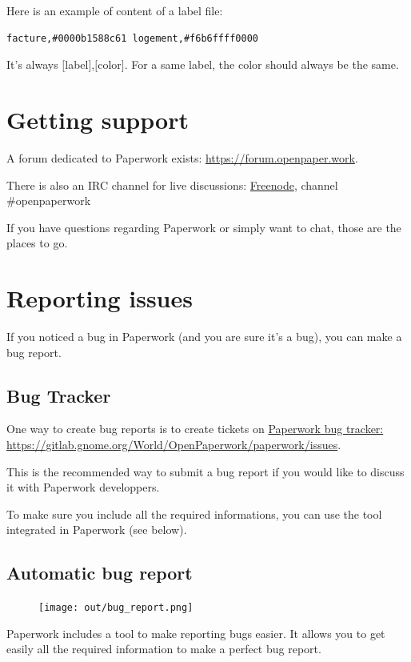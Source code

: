 \documentclass[10pt,a4paper]{article}
\begin{document}
Here is an example of content of a label file:
\begin{verbatim}
facture,#0000b1588c61 logement,#f6b6ffff0000
\end{verbatim}
It's always $[$label$]$,$[$color$]$. For a same label, the color should
always be the same.


\section{Getting support}

A forum dedicated to Paperwork exists:
\href{https://forum.openpaper.work}{https://forum.openpaper.work}.

There is also an IRC channel for live discussions:
\href{https://webchat.freenode.net/}{Freenode}, channel \#openpaperwork

If you have questions regarding Paperwork or simply want to chat, those are
the places to go.

\section{Reporting issues}

If you noticed a bug in Paperwork (and you are sure it's a bug), you can
make a bug report.

\subsection{Bug Tracker}

One way to create bug reports is to create tickets on
\href{https://gitlab.gnome.org/World/OpenPaperwork/paperwork/issues}{Paperwork bug tracker: https://gitlab.gnome.org/World/OpenPaperwork/paperwork/issues}.

This is the recommended way to submit a bug report if you would like to discuss
it with Paperwork developpers.

To make sure you include all the required informations, you can use the
tool integrated in Paperwork (see below).


\subsection{Automatic bug report}

\begin{figure}[H]
	\texttt{[image: out/bug\_report.png]}
\end{figure}

Paperwork includes a tool to make reporting bugs easier. It allows you to get
easily all the required information to make a perfect bug report.
\end{document}
